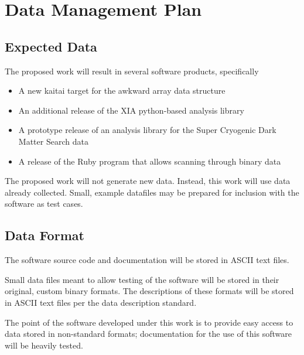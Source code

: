 \documentclass[11pt]{article}
\begin{document}

\section*{Data Management Plan}

\subsection{Expected Data}

The proposed work will result in several software products, specifically

\begin{itemize}
    \item A new kaitai target for the awkward array data structure
    \item An additional release of the XIA python-based analysis library
    \item A prototype release of an analysis library for the Super Cryogenic Dark Matter Search data
    \item A release of the Ruby program that allows scanning through binary data
\end{itemize}

The proposed work will not generate new data.  Instead, this work will use data already collected.  Small, example datafiles may be prepared for inclusion with the software as test cases.

\subsection{Data Format}
The software source code and documentation will be stored in ASCII text files.  

Small data files meant to allow testing of the software will be stored in their original, custom binary formats.  The descriptions of these formats will be stored in ASCII text files per the data description standard.

The point of the software developed under this work is to provide easy access to data stored in non-standard formats; documentation for the use of this software will be heavily tested.

\end{document}
